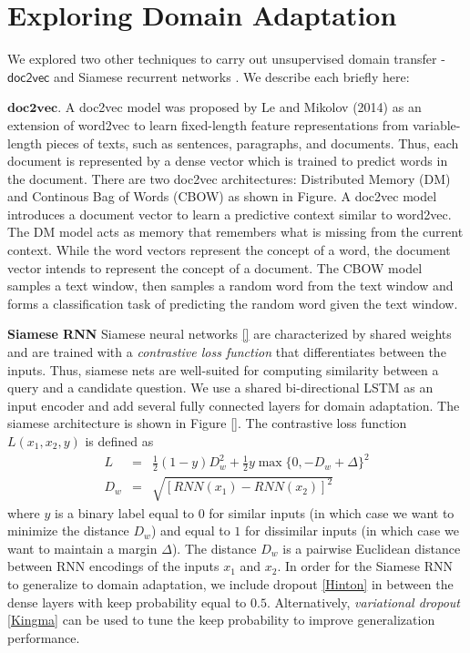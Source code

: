 \documentclass{sigkddExp}
\begin{document}
\section{Exploring Domain Adaptation}
\label{other_techniques}
We explored two other techniques to carry out unsupervised domain transfer - $\textsf{doc2vec}$ \cite{doc2vec1} and Siamese recurrent networks \cite{siamese}. We describe each briefly here:
\begin{itemize}[topsep=0pt,itemsep=-1ex,partopsep=1ex,parsep=1ex]
{\color{red}
\item $\textbf{doc2vec}$. A doc2vec model was proposed by Le and Mikolov (2014) as an extension of word2vec to learn fixed-length feature representations from variable-length pieces of texts, such as sentences, paragraphs, and documents. Thus, each document is represented by a dense vector which is trained to predict words in the document. There are two doc2vec architectures: Distributed Memory (DM) and Continous Bag of Words (CBOW) as shown in Figure{}. A doc2vec model introduces a document vector to learn a predictive context similar to word2vec. The DM model acts as memory that remembers what is missing from the current context. While the word vectors represent the concept of a word, the document vector intends to represent the concept of a document. The CBOW model samples a text window, then samples a random word from the text window and forms a classification task of predicting the random word given the text window.
}
\item \textbf{Siamese RNN} 
{\color{red} Siamese neural networks \ref{} are characterized by shared weights and are trained with a \textit{contrastive loss function} that differentiates between the inputs. Thus, siamese nets are well-suited for computing similarity between a query and a candidate question. We use a shared bi-directional LSTM as an input encoder and add several fully connected layers for domain adaptation. The siamese architecture is shown in Figure \ref{}. The contrastive loss function $L(x_1,x_2,y)$ is defined as
\begin{eqnarray}
L &=& \frac{1}{2}(1-y)D_{w}^{2} + \frac{1}{2}y \max \{0, -D_w + \Delta\}^{2} \\
D_w &=& \sqrt{[RNN(x_1) - RNN(x_2)]^2}
\end{eqnarray}
where $y$ is a binary label equal to $0$ for similar inputs (in which case we want to minimize the distance $D_w$) and equal to $1$ for dissimilar inputs (in which case we want to maintain a margin $\Delta$). The distance $D_w$ is a pairwise Euclidean distance between RNN encodings of the inputs $x_1$ and $x_2$. In order for the Siamese RNN to generalize to domain adaptation, we include dropout \ref{Hinton} in between the dense layers with keep probability equal to $0.5$. Alternatively, \textit{variational dropout} \ref{Kingma} can be used to tune the keep probability to improve generalization performance.
}

\end{itemize}
\end{document}
